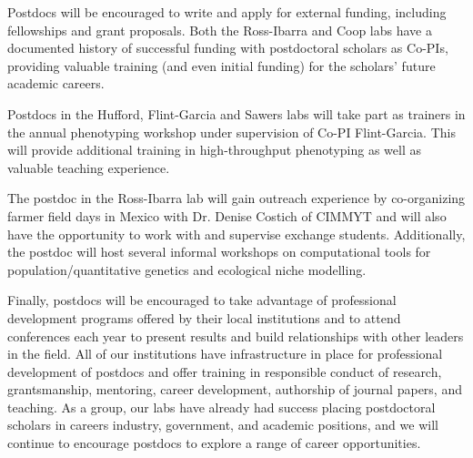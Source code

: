 Postdocs will be encouraged to write and apply for external funding, including fellowships and grant proposals.  Both the Ross-Ibarra and Coop labs have a documented history of successful funding with postdoctoral scholars as Co-PIs, providing valuable training (and even initial funding) for the scholars' future academic careers.

Postdocs in the Hufford, Flint-Garcia and Sawers labs will take part as trainers in the annual phenotyping workshop under supervision of Co-PI Flint-Garcia.  This will provide additional training in high-throughput phenotyping as well as valuable teaching experience.

The postdoc in the Ross-Ibarra lab will gain outreach experience by co-organizing farmer field days in Mexico with Dr. Denise Costich of CIMMYT and will also have the opportunity to work with and supervise exchange students. Additionally, the postdoc will host several informal workshops on computational tools for population/quantitative genetics and ecological niche modelling.

Finally, postdocs will be encouraged to take advantage of professional development programs offered by their local institutions and to attend conferences each year to present results and build relationships with other leaders in the field. All of our institutions have infrastructure in place for professional development of postdocs and offer training in responsible conduct of research, grantsmanship, mentoring, career development, authorship of journal papers, and teaching. As a group, our labs have already had success placing postdoctoral scholars in careers industry, government, and academic positions, and we will continue to encourage postdocs to explore a range of career opportunities.